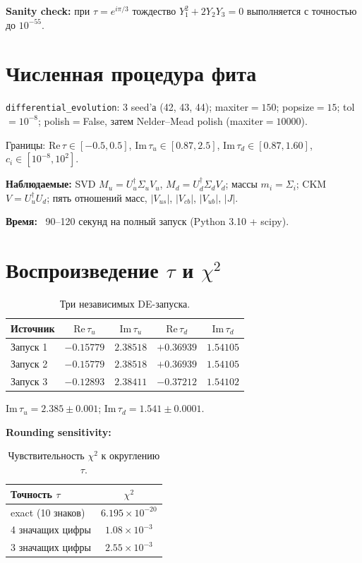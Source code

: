 \documentclass[12pt,a4paper]{article}
\numberwithin{equation}{section}
\begin{document}
\textbf{Sanity check:} при $\tau = e^{i\pi/3}$ тождество
$Y_1^2 + 2 Y_2 Y_3 = 0$ выполняется с точностью до $10^{-55}$.

\section{Численная процедура фита}
\label{app:procedure}

\texttt{differential\_evolution}:
3 seed'а (42, 43, 44); maxiter$=150$; popsize$=15$; tol$=10^{-8}$;
polish$=$False, затем Nelder--Mead polish (maxiter$=10000$).

Границы:
$\mathrm{Re}\,\tau \in [-0.5, 0.5]$, $\mathrm{Im}\,\tau_u \in [0.87, 2.5]$,
$\mathrm{Im}\,\tau_d \in [0.87, 1.60]$, $c_i \in [10^{-8}, 10^2]$.

\textbf{Наблюдаемые:} SVD $M_u = U_u^\dagger \Sigma_u V_u$,
$M_d = U_d^\dagger \Sigma_d V_d$;
массы $m_i = \Sigma_i$; CKM $V = U_u^\dagger U_d$;
пять отношений масс, $|V_{us}|$, $|V_{cb}|$, $|V_{ub}|$, $|J|$.

\textbf{Время:} ~90--120 секунд на полный запуск (Python 3.10 + scipy).

\section{Воспроизведение $\tau$ и $\chi^2$}
\label{app:reproduce}

\begin{table}[H]
\centering
\caption{Три независимых DE-запуска.}
\begin{tabular}{lcccc}
\toprule
Источник & $\mathrm{Re}\,\tau_u$ & $\mathrm{Im}\,\tau_u$ &
          $\mathrm{Re}\,\tau_d$ & $\mathrm{Im}\,\tau_d$ \\
\midrule
Запуск 1 & $-0.15779$ & $2.38518$ & $+0.36939$ & $1.54105$ \\
Запуск 2 & $-0.15779$ & $2.38518$ & $+0.36939$ & $1.54105$ \\
Запуск 3 & $-0.12893$ & $2.38411$ & $-0.37212$ & $1.54102$ \\
\bottomrule
\end{tabular}
\end{table}

$\mathrm{Im}\,\tau_u = 2.385 \pm 0.001$;
$\mathrm{Im}\,\tau_d = 1.541 \pm 0.0001$.

\textbf{Rounding sensitivity:}

\begin{table}[H]
\centering
\caption{Чувствительность $\chi^2$ к округлению $\tau$.}
\begin{tabular}{lc}
\toprule
Точность $\tau$ & $\chi^2$ \\
\midrule
exact (10 знаков) & $6.195\times10^{-20}$ \\
4 значащих цифры  & $1.08\times10^{-3}$ \\
3 значащих цифры  & $2.55\times10^{-3}$ \\
\bottomrule
\end{tabular}
\end{table}
\end{document}
